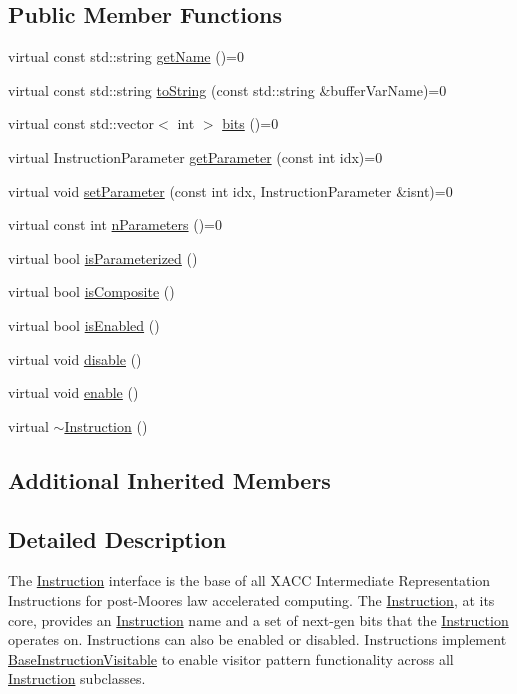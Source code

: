 \subsection*{Public Member Functions}
\begin{DoxyCompactItemize}
\item 
virtual const std\+::string \hyperlink{a00161_ac7ff23f693e2276edbf3fdac5452792c}{get\+Name} ()=0
\item 
virtual const std\+::string \hyperlink{a00161_ae94c2d089908294c1d410b14c96817ae}{to\+String} (const std\+::string \&buffer\+Var\+Name)=0
\item 
virtual const std\+::vector$<$ int $>$ \hyperlink{a00161_a819f32e94c3e1c9e69a0061aaf8d86dc}{bits} ()=0
\item 
virtual Instruction\+Parameter \hyperlink{a00161_aa0d9de97a4833a042379647f83c33ab6}{get\+Parameter} (const int idx)=0
\item 
virtual void \hyperlink{a00161_a407a0ac662fa0b1ec3e301e8ff9bade7}{set\+Parameter} (const int idx, Instruction\+Parameter \&isnt)=0
\item 
virtual const int \hyperlink{a00161_ad54585d13c04ffd20296fff7ab8107ff}{n\+Parameters} ()=0
\item 
virtual bool \hyperlink{a00161_a7b24d8ae485369fc2b2df7a3224a5e26}{is\+Parameterized} ()
\item 
virtual bool \hyperlink{a00161_a4383f1036d0fcfe890ab9c613dbd5f38}{is\+Composite} ()
\item 
virtual bool \hyperlink{a00161_ad02a1cf7220577124720b7a51424cea7}{is\+Enabled} ()
\item 
virtual void \hyperlink{a00161_a6e528da15e05a94cc1d7db268c483271}{disable} ()
\item 
virtual void \hyperlink{a00161_a0b4f2e5a591af28342a3c08e4305e24f}{enable} ()
\item 
virtual \hyperlink{a00161_ae22c935e8113bce63d1d0e214cda4d61}{$\sim$\+Instruction} ()
\end{DoxyCompactItemize}
\subsection*{Additional Inherited Members}


\subsection{Detailed Description}
The \hyperlink{a00161}{Instruction} interface is the base of all X\+A\+CC Intermediate Representation Instructions for post-\/\+Moore\textquotesingle{}s law accelerated computing. The \hyperlink{a00161}{Instruction}, at its core, provides an \hyperlink{a00161}{Instruction} name and a set of next-\/gen bits that the \hyperlink{a00161}{Instruction} operates on. Instructions can also be enabled or disabled. Instructions implement \hyperlink{a00043}{Base\+Instruction\+Visitable} to enable visitor pattern functionality across all \hyperlink{a00161}{Instruction} subclasses.

